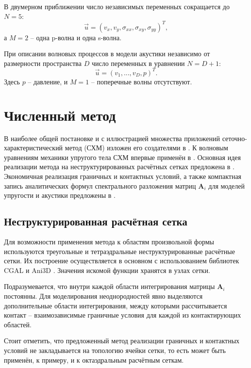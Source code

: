 В двумерном приближении число независимых переменных сокращается до $N = 5$:
\begin{equation}
	\vec{u} = (v_x,v_y,\sigma_{xx},\sigma_{xy},\sigma_{yy})^{T},
\end{equation}
а $M = 2$ -- одна p-волна и одна s-волна.

При описании волновых процессов в модели акустики независимо от размерности 
пространства $D$ число переменных в уравнении $N = D + 1$:
\begin{equation}
	\vec{u} = (v_1, ..., v_D, p)^T.
\end{equation}
Здесь $p$ -- давление, и $M = 1$ -- поперечные волны отсутствуют.


\section{Численный метод}
В наиболее общей постановке и с иллюстрацией множества приложений 
сеточно-характеристический метод (СХМ) 
изложен его создателями в \cite{magomedov_kholodov_1988}. 
К волновым уравнениям механики упругого тела 
СХМ впервые применён в \cite{petrov_kholodov}.
Основная идея реализации метода на неструктурированных расчётных сетках
предложена в \cite{magomedov_kholodov_1988}. 
Экономичная реализация граничных и контактных условий, а также
компактная запись аналитических формул спектрального разложения 
матриц $\mathbf{A}_i$ для моделей упругости и акустики предложены в \cite{chelnokov}.


\subsection{Неструктурированная расчётная сетка}
Для возможности применения метода к областям произвольной формы используются
треугольные и тетраэдральные неструктурированные расчётные сетки. 
Их построение осуществляется в основном с использованием 
библиотек CGAL \cite{cgal} и Ani3D \cite{ani3d}.
Значения искомой функции хранятся в узлах сетки. 

Подразумевается, что внутри каждой области интегрирования матрицы $\mathbf{A}_i$
постоянны. Для моделирования неоднородностей явно выделяются дополнительные
области интегрирования, между которыми рассчитывается контакт -- взаимозависимые
граничные условия для каждой из контактирующих областей.

Стоит отметить, что предложенный метод реализации граничных и контактных условий 
не закладывается на топологию ячейки сетки, то есть может быть применён, 
к примеру, и к октаэдральным расчётным сеткам.


